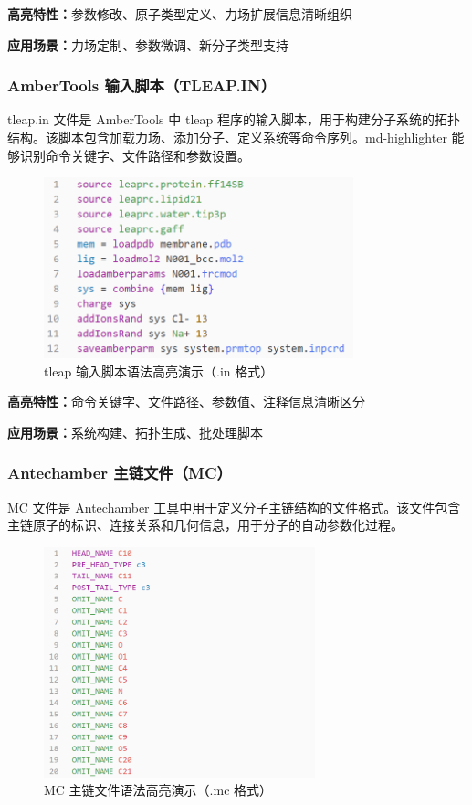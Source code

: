 \textbf{高亮特性：}参数修改、原子类型定义、力场扩展信息清晰组织

\textbf{应用场景：}力场定制、参数微调、新分子类型支持

\subsubsection{AmberTools 输入脚本（TLEAP.IN）}

tleap.in 文件是 AmberTools 中 tleap 程序的输入脚本，用于构建分子系统的拓扑结构。该脚本包含加载力场、添加分子、定义系统等命令序列。md-highlighter 能够识别命令关键字、文件路径和参数设置。

\begin{figure}[!h]
    \centering
    \includegraphics[width=0.8\textwidth]{../images/tleap.in.png}
    \caption{tleap 输入脚本语法高亮演示（.in 格式）}
    \label{fig:tleap-highlighting}
\end{figure}

\textbf{高亮特性：}命令关键字、文件路径、参数值、注释信息清晰区分

\textbf{应用场景：}系统构建、拓扑生成、批处理脚本

\subsubsection{Antechamber 主链文件（MC）}

MC 文件是 Antechamber 工具中用于定义分子主链结构的文件格式。该文件包含主链原子的标识、连接关系和几何信息，用于分子的自动参数化过程。

\begin{figure}[!h]
    \centering
    \includegraphics[width=0.7\textwidth]{../images/mc.png}
    \caption{MC 主链文件语法高亮演示（.mc 格式）}
    \label{fig:mc-highlighting}
\end{figure}

